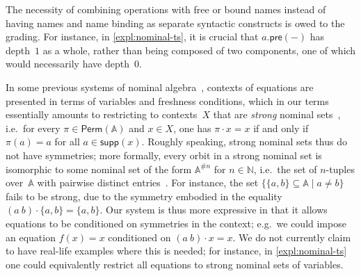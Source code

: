 \documentclass[a4paper,UKenglish,cleveref,thm-restate,numberwithinsect,final]{lipics-v2021}
\newcommand{\Perm}{\mathsf{Perm}(\Names)}
\newcommand{\pre}{\mathsf{pre}}
\newcommand{\Names}{\mathbb{A}}
\newcommand{\fresh}{\mathbin{\#}}
\newcommand{\supp}{\mathsf{supp}}
\theoremstyle{plain}
\numberwithin{equation}{section}
\newcommand{\Nat}{{\mathbb{N}}}
\newcommand{\Set}{\mathbf{Set}}
\newcommand{\+}[1]{\mathcal{#1}\xspace}
\newcommand{\Nom}{\mathbf{Nom}}
\theoremstyle{definition}
\begin{document}
\begin{remark}\label{rem:expressiveness}
  The necessity of combining operations with free or bound names
  instead of having names and name binding as separate syntactic
  constructs is owed to the grading. For instance, in
  \cref{expl:nominal-ts}, it is crucial that $a.\pre(-)$ has
  depth~$1$ as a whole, rather than being composed of two components,
  one of which would necessarily have depth~$0$.

  In some previous systems of nominal
  algebra~\cite{Gabbay09,GabbayMathijssen09}, contexts of equations
  are presented in terms of variables and freshness conditions, which
  in our terms essentially amounts to restricting to contexts~$X$ that
  are \emph{strong} nominal sets~\cite{TzevelekosThesis}, i.e.~for
  every $\pi\in \Perm$ and $x\in X$, one has $\pi\cdot x = x$ if and
  only if $\pi(a)=a$ for all $a\in \supp(x)$. %
  Roughly speaking, strong nominal sets thus do not have symmetries;
  more formally, every orbit in a strong nominal set is isomorphic to
  some nominal set of the form $\Names^{\fresh n}$ for $n\in\Nat$,
  i.e.~the set of $n$-tuples over~$\Names$ with pairwise distinct
  entries~\cite[Lemma~2.4.2]{Petrisan11}. For instance, the set
  $\{\{a,b\}\subseteq\Names\mid a\neq b\}$ fails to be strong, due to
  the symmetry embodied in the equality
  $(a\ b)\cdot\{a,b\}=\{a,b\}$. Our system is thus more expressive in
  that it allows equations to be conditioned on symmetries in the
  context; e.g.~we could impose an equation $f(x)=x$ conditioned on
  $(a\ b)\cdot x=x$. We do not currently claim to have real-life
  examples where this is needed; for instance, in
  \cref{expl:nominal-ts} one could equivalently restrict all equations
  to strong nominal sets of variables.

\end{remark}
\end{document}
